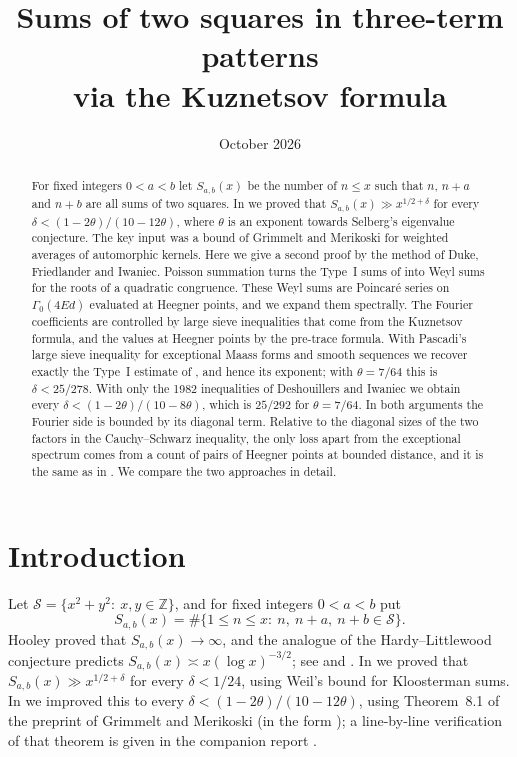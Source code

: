 \documentclass[11pt]{amsart}
\title[Three-term patterns via the Kuznetsov formula]{Sums of two squares in three-term patterns\\ via the Kuznetsov formula}
\date{October 2026}
\theoremstyle{remark}
\theoremstyle{definition}
\numberwithin{equation}{section}
\newcommand{\Sc}{\mathcal{S}}
\newcommand{\Z}{\mathbb{Z}}
\begin{document}
\begin{abstract}
For fixed integers $0<a<b$ let $S_{a,b}(x)$ be the number of $n\le x$ such that $n$, $n+a$ and $n+b$ are all sums of two squares. In \cite{II} we proved that $S_{a,b}(x)\gg x^{1/2+\delta}$ for every $\delta<(1-2\theta)/(10-12\theta)$, where $\theta$ is an exponent towards Selberg's eigenvalue conjecture. The key input was a bound of Grimmelt and Merikoski for weighted averages of automorphic kernels. Here we give a second proof by the method of Duke, Friedlander and Iwaniec. Poisson summation turns the Type~I sums of \cite{II} into Weyl sums for the roots of a quadratic congruence. These Weyl sums are Poincar\'e series on $\Gamma_0(4Ed)$ evaluated at Heegner points, and we expand them spectrally. The Fourier coefficients are controlled by large sieve inequalities that come from the Kuznetsov formula, and the values at Heegner points by the pre-trace formula. With Pascadi's large sieve inequality for exceptional Maass forms and smooth sequences we recover exactly the Type~I estimate of \cite{II}, and hence its exponent; with $\theta=7/64$ this is $\delta<25/278$. With only the 1982 inequalities of Deshouillers and Iwaniec we obtain every $\delta<(1-2\theta)/(10-8\theta)$, which is $25/292$ for $\theta=7/64$. In both arguments the Fourier side is bounded by its diagonal term. Relative to the diagonal sizes of the two factors in the Cauchy--Schwarz inequality, the only loss apart from the exceptional spectrum comes from a count of pairs of Heegner points at bounded distance, and it is the same as in \cite{II}. We compare the two approaches in detail.
\end{abstract}

\maketitle

\section{Introduction}

Let $\Sc=\{x^2+y^2:\ x,y\in\Z\}$, and for fixed integers $0<a<b$ put
\[
S_{a,b}(x)=\#\{1\le n\le x:\ n,\ n+a,\ n+b\in\Sc\}.
\]
Hooley \cite{Ho73} proved that $S_{a,b}(x)\to\infty$, and the analogue of the Hardy--Littlewood conjecture predicts $S_{a,b}(x)\asymp x(\log x)^{-3/2}$; see \cite[\S1]{I} and \cite{FKR}. In \cite{I} we proved that $S_{a,b}(x)\gg x^{1/2+\delta}$ for every $\delta<1/24$, using Weil's bound for Kloosterman sums. In \cite{II} we improved this to every $\delta<(1-2\theta)/(10-12\theta)$, using Theorem~8.1 of the preprint \cite{GM1} of Grimmelt and Merikoski (in the form \cite[Theorem~2.1]{GM2}); a line-by-line verification of that theorem is given in the companion report \cite{V}.
\end{document}

